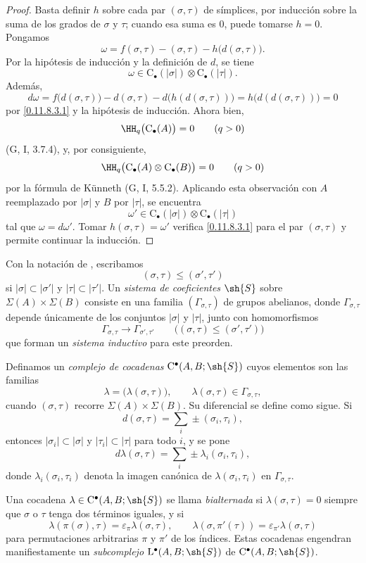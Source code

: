 \documentclass[oneside]{amsart}
\renewcommand{\leq}{\leqslant}
\let\EGAOriginalLabel\label
\renewcommand{\label}[1]{\phantomsection\EGAOriginalLabel{#1}}
\begin{document}
\begin{proof}
Basta definir $h$ sobre cada par $(\sigma,\tau)$ de símplices, por
inducción sobre la suma de los grados de $\sigma$ y $\tau$; cuando esa suma
es $0$, puede tomarse $h=0$.
Pongamos
\[
  \omega
  =
  f(\sigma,\tau)-(\sigma,\tau)-h\bigl(d(\sigma,\tau)\bigr).
\]
Por la hipótesis de inducción y la definición de $d$, se tiene
\[
  \omega
  \in
  \mathrm{C}_\bullet(|\sigma|)
  \otimes
  \mathrm{C}_\bullet(|\tau|).
\]
Además,
\[
  d\omega
  =
  f\bigl(d(\sigma,\tau)\bigr)
  -d(\sigma,\tau)
  -d\bigl(h(d(\sigma,\tau))\bigr)
  =
  h\bigl(d(d(\sigma,\tau))\bigr)
  =
  0
\]
por \eqref{0.11.8.3.1} y la hipótesis de inducción.
Ahora bien,
\[
  \HH_q\bigl(\mathrm{C}_\bullet(A)\bigr)=0
  \qquad(q>0)
\]
(G, I, 3.7.4), y, por consiguiente,
\[
  \HH_q\bigl(
    \mathrm{C}_\bullet(A)\otimes\mathrm{C}_\bullet(B)
  \bigr)=0
  \qquad(q>0)
\]
por la fórmula de K\"unneth (G, I, 5.5.2).
Aplicando esta observación con $A$ reemplazado por $|\sigma|$ y $B$ por
$|\tau|$, se encuentra
\[
  \omega'
  \in
  \mathrm{C}_\bullet(|\sigma|)
  \otimes
  \mathrm{C}_\bullet(|\tau|)
\]
tal que $\omega=d\omega'$.
Tomar $h(\sigma,\tau)=\omega'$ verifica \eqref{0.11.8.3.1} para el par
$(\sigma,\tau)$ y permite continuar la inducción.
\end{proof}

\begin{env}[11.8.4]
\label{0.11.8.4}
Con la notación de , escribamos
\[
  (\sigma,\tau)\leq(\sigma',\tau')
\]
si $|\sigma|\subset|\sigma'|$ y $|\tau|\subset|\tau'|$.
Un \emph{sistema de coeficientes} $\sh{S}$ sobre
$\Sigma(A)\times\Sigma(B)$ consiste en una familia
$(\Gamma_{\sigma,\tau})$ de grupos abelianos, donde
$\Gamma_{\sigma,\tau}$ depende únicamente de los conjuntos $|\sigma|$ y
$|\tau|$, junto con homomorfismos
\[
  \Gamma_{\sigma,\tau}
  \longrightarrow
  \Gamma_{\sigma',\tau'}
  \qquad
  \bigl((\sigma,\tau)\leq(\sigma',\tau')\bigr)
\]
que forman un \emph{sistema inductivo} para este preorden.

Definamos un \emph{complejo de cocadenas} $\mathrm{C}^\bullet(A,B;\sh{S})$ cuyos elementos
son las familias
\[
  \lambda=\bigl(\lambda(\sigma,\tau)\bigr),
  \qquad
  \lambda(\sigma,\tau)\in\Gamma_{\sigma,\tau},
\]
cuando $(\sigma,\tau)$ recorre $\Sigma(A)\times\Sigma(B)$.
Su diferencial se define como sigue.
Si
\[
  d(\sigma,\tau)=\sum_i\pm(\sigma_i,\tau_i),
\]
entonces $|\sigma_i|\subset|\sigma|$ y $|\tau_i|\subset|\tau|$ para todo
$i$, y se pone
\[
  d\lambda(\sigma,\tau)
  =
  \sum_i\pm\lambda_i(\sigma_i,\tau_i),
\]
donde $\lambda_i(\sigma_i,\tau_i)$ denota la imagen canónica de
$\lambda(\sigma_i,\tau_i)$ en $\Gamma_{\sigma,\tau}$.

Una cocadena $\lambda\in\mathrm{C}^\bullet(A,B;\sh{S})$ se llama
\emph{bialternada} si $\lambda(\sigma,\tau)=0$ siempre que $\sigma$
o $\tau$ tenga dos términos iguales, y si
\[
  \lambda(\pi(\sigma),\tau)
  =
  \varepsilon_\pi\lambda(\sigma,\tau),
  \qquad
  \lambda(\sigma,\pi'(\tau))
  =
  \varepsilon_{\pi'}\lambda(\sigma,\tau)
\]
para permutaciones arbitrarias $\pi$ y $\pi'$ de los índices.
Estas cocadenas engendran manifiestamente un \emph{subcomplejo}
$\mathrm{L}^\bullet(A,B;\sh{S})$ de
$\mathrm{C}^\bullet(A,B;\sh{S})$.
\end{env}
\end{document}

